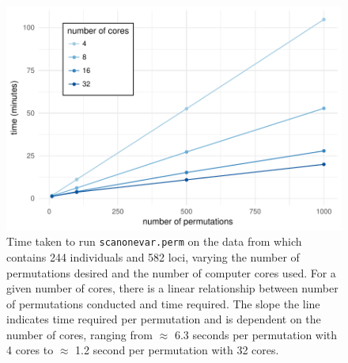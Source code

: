 \begin{figure}
    \includegraphics[width = \linewidth]{images/benchmark_kumar.pdf}
    \caption[
        Time taken to run \texttt{scanonevar.perm} on the data from \citet{Kumar2013} which contains 244 individuals and 582 loci, varying the number of permutations desired and the number of computer cores used.
    ]
    {
        Time taken to run \texttt{scanonevar.perm} on the data from \citet{Kumar2013} which contains 244 individuals and 582 loci, varying the number of permutations desired and the number of computer cores used.
        For a given number of cores, there is a linear relationship between number of permutations conducted and time required.
        The slope the line indicates time required per permutation and is dependent on the number of cores, ranging from $\approx$ 6.3 seconds per permutation with 4 cores to $\approx$ 1.2 second per permutation with 32 cores.
    }
    \label{fig:benchmark_kumar}
\end{figure}

